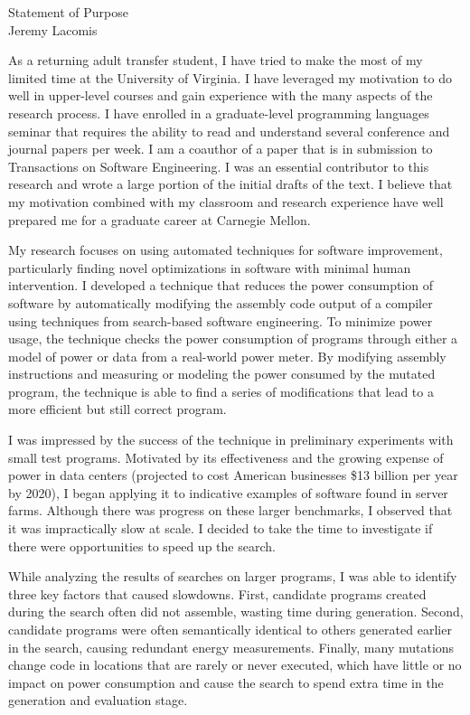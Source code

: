 \documentclass[12pt]{article}
\newcommand{\soptitle}{Statement of Purpose}
\newcommand{\yourname}{Jeremy Lacomis}
\begin{document}
\begin{center}\large\soptitle\\
\large \yourname
\end{center}

\bigskip

As a returning adult transfer student, I have tried to make the most of my
limited time at the University of Virginia. I have leveraged my motivation to do
well in upper-level courses and gain experience with the many aspects of the
research process. I have enrolled in a graduate-level programming languages
seminar that requires the ability to read and understand several conference and
journal papers per week. I am a coauthor of a paper that is in submission to
Transactions on Software Engineering. I was an essential contributor to this
research and wrote a large portion of the initial drafts of the text. I believe
that my motivation combined with my classroom and research experience have well
prepared me for a graduate career at Carnegie Mellon.

My research focuses on using automated techniques for software improvement,
particularly finding novel optimizations in software with minimal human
intervention. I developed a technique that reduces the power consumption of
software by automatically modifying the assembly code output of a compiler using
techniques from search-based software engineering. To minimize power usage, the
technique checks the power consumption of programs through either a model of
power or data from a real-world power meter. By modifying assembly
instructions and measuring or modeling the power consumed by the mutated
program, the technique is able to find a series of modifications that lead to a
more efficient but still correct program.

I was impressed by the success of the technique in preliminary experiments with
small test programs. Motivated by its effectiveness and the growing expense of
power in data centers (projected to cost American businesses \$13 billion per
year by 2020), I began applying it to indicative examples of software found in
server farms. Although there was progress on these larger benchmarks, I observed
that it was impractically slow at scale. I decided to take the time to
investigate if there were opportunities to speed up the search.

While analyzing the results of searches on larger programs, I was able to
identify three key factors that caused slowdowns. First, candidate programs
created during the search often did not assemble, wasting time during
generation. Second, candidate programs were often semantically identical to
others generated earlier in the search, causing redundant energy
measurements. Finally, many mutations change code in locations that are rarely
or never executed, which have little or no impact on power consumption and cause
the search to spend extra time in the generation and evaluation stage.
\end{document}
